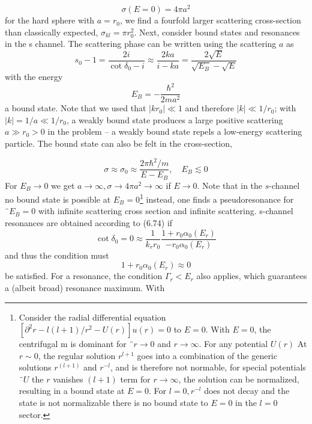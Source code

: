 %
\begin{equation}
    \sigma(E=0)=4 \pi a^{2}
    \end{equation}
for the hard sphere with $a = r_0$, we find a fourfold larger scattering cross-section than classically expected, $\sigma_{kl} = \pi r^2_0$.
Next, consider bound states and resonances in the s channel. The scattering phase can be written using the scattering $a$ as
\begin{equation}
    s_{0}-1=\frac{2 i}{\cot \delta_{0}-i} \approx \frac{2 k a}{i-k a}=\frac{2 \sqrt{E}}{\sqrt{E_{B}}-\sqrt{E}}
    \end{equation}
with the energy
\begin{equation}
    E_{B}=-\frac{\hbar^{2}}{2 m a^{2}}
    \end{equation}
a bound state. Note that we used that $| kr_0 |\ll 1$ and therefore $| k |\ll 1 / r_0$; with $| k | = 1 / a\ll 1 / r_0$, a weakly bound state produces a large positive scattering $a\gg r_0> 0$ in the problem -- a weakly bound state repels a low-energy scattering particle. The bound state can also be felt in the cross-section,

\begin{equation}
    \sigma \approx \sigma_{0} \approx \frac{2 \pi \hbar^{2} / m}{E-E_{B}}, \quad E_{B} \lesssim 0
    \end{equation}
For $E_B \rightarrow 0$ we get $a \rightarrow \infty, \sigma\rightarrow 4\pi a^2 \rightarrow \infty$ if $E \rightarrow 0$. Note that in the $s$-channel no bound state is possible at $E_B = 0$\footnote{Consider the radial differential equation $[\partial^2r - l (l + 1) / r^2 - U (r)] u (r) = 0$ to $E = 0$. With $E = 0$, the centrifugal m is dominant for $¨r \rightarrow 0$ and $r \rightarrow\infty$. For any potential $U (r)$ At $r \sim 0$, the regular solution $r^{l + 1}$ goes into a combination of the generic solutions $r^(l + 1)$ and $r^{-l}$, and is therefore not normable, for special potentials $¨U$ the $r$ vanishes $(l + 1)$ term for $r\rightarrow\infty$, the solution can be normalized, resulting in a bound state at $E = 0$. For $l = 0, r^{-l}$ does not decay and the state is not normalizable there is no bound state to $E = 0$ in the $l = 0$ sector.} instead, one finds a pseudoresonance for $¨ E_B = 0$ with infinite scattering cross section and infinite scattering.
s-channel resonances are obtained according to (6.74) if
\begin{equation}
    \cot \delta_{0}=0 \approx \frac{1}{k_{r} r_{0}} \frac{1+r_{0} \alpha_{0}\left(E_{r}\right)}{-r_{0} \alpha_{0}\left(E_{r}\right)}
    \end{equation}
and thus the condition must
\begin{equation}
    1+r_{0} \alpha_{0}\left(E_{r}\right) \approx 0
    \end{equation}
be satisfied. For a resonance, the condition $\Gamma_r <E_r$ also applies, which guarantees a (albeit broad) resonance maximum. With

